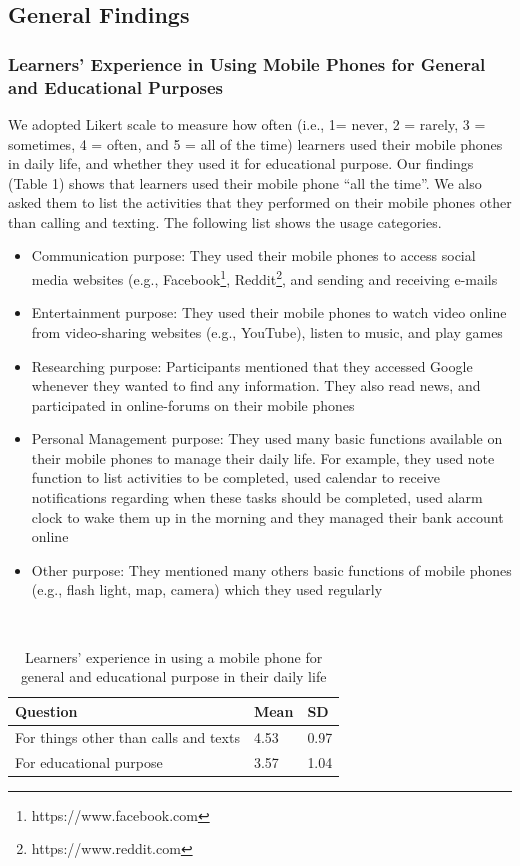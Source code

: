 \documentclass[a4paper,twoside]{article}
\begin{document}
\subsection{General Findings}
\subsubsection{Learners' Experience in Using Mobile Phones for General and Educational Purposes}
\noindent We adopted Likert scale to measure how often (i.e., 1= never, 2 = rarely, 3 = sometimes, 4 = often, and 5 = all of the time) learners used their mobile phones in daily life, and whether they used it for educational purpose. Our findings (Table 1) shows that learners used their mobile phone ``all the time''. We also asked them to list the activities that they performed on their mobile phones other than calling and texting. The following list shows the usage categories. 
\begin{itemize}
\item{Communication purpose: They used their mobile phones to access social media websites (e.g., Facebook\footnote{https://www.facebook.com}, Reddit\footnote{https://www.reddit.com}, and sending and receiving e-mails}
\item{Entertainment purpose: They used their mobile phones to watch video online from video-sharing websites (e.g., YouTube), listen to music, and play games}
\item{Researching purpose: Participants mentioned that they accessed Google whenever they wanted to find any information. They also read news, and participated in online-forums on their mobile phones}
\item{Personal Management purpose: They used many basic functions available on their mobile phones to manage their daily life. For example, they used note function to list activities to be completed, used calendar to receive notifications regarding when these tasks should be completed, used alarm clock to wake them up in the morning and they managed their bank account online}
\item{Other purpose: They mentioned many others basic functions of mobile phones (e.g., flash light, map, camera) which they used regularly}
\end{itemize}
\begin{table}
\centering
\caption{Learners' experience in using a mobile phone for general and educational purpose in their daily life}\
\begin{tabular}[BP]{ | p{3.5cm} | p{1.3cm} | p{1.3cm} |}
\hline Question & Mean & SD\\ 
\hline For things other than calls and texts & 4.53 & 0.97\\
\hline For educational purpose & 3.57 &1.04\\
\hline 
\end{tabular}
\end{table}
\end{document}
